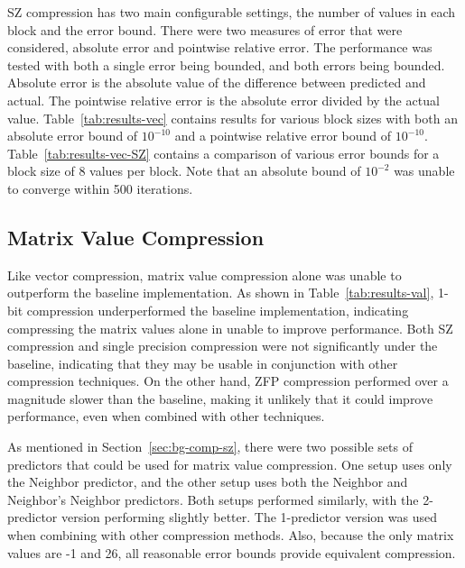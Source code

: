 SZ compression has two main configurable settings, the number of values in each block and the error bound.
There were two measures of error that were considered, absolute error and pointwise relative error.
The performance was tested with both a single error being bounded, and both errors being bounded.
Absolute error is the absolute value of the difference between predicted and actual.
The pointwise relative error is the absolute error divided by the actual value.
Table~\ref{tab:results-vec} contains results for various block sizes with both an absolute error bound of \(10^{-10}\) and a pointwise relative error bound of \(10^{-10}\).
Table~\ref{tab:results-vec-SZ} contains a comparison of various error bounds for a block size of 8 values per block.
Note that an absolute bound of \(10^{-2}\) was unable to converge within 500 iterations.


\subsection{Matrix Value Compression}
\label{sec:results-vals}
Like vector compression, matrix value compression alone was unable to outperform the baseline implementation.
As shown in Table~\ref{tab:results-val}, 1-bit compression underperformed the baseline implementation, indicating compressing the matrix values alone in unable to improve performance.
Both SZ compression and single precision compression were not significantly under the baseline, indicating that they may be usable in conjunction with other compression techniques.
On the other hand, ZFP compression performed over a magnitude slower than the baseline, making it unlikely that it could improve performance, even when combined with other techniques.

As mentioned in Section~\ref{sec:bg-comp-sz}, there were two possible sets of predictors that could be used for matrix value compression.
One setup uses only the Neighbor predictor, and the other setup uses both the Neighbor and Neighbor's Neighbor predictors.
Both setups performed similarly, with the 2-predictor version performing slightly better.
The 1-predictor version was used when combining with other compression methods.
Also, because the only matrix values are -1 and 26, all reasonable error bounds provide equivalent compression.

